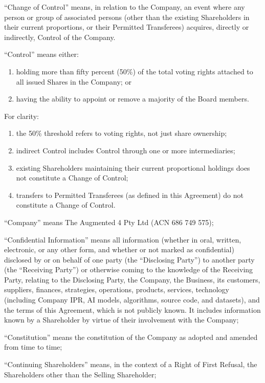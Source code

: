 ``Change of Control'' means, in relation to the Company, an event where any person or group of associated persons (other than the existing Shareholders in their current proportions, or their Permitted Transferees) acquires, directly or indirectly, Control of the Company. 

``Control'' means either:
\begin{enumerate}[label=(\alph*)]
\item holding more than fifty percent (50\%) of the total voting rights attached to all issued Shares in the Company; or
\item having the ability to appoint or remove a majority of the Board members.
\end{enumerate}

For clarity:
\begin{enumerate}[label=(\roman*)]
\item the 50\% threshold refers to voting rights, not just share ownership;
\item indirect Control includes Control through one or more intermediaries;
\item existing Shareholders maintaining their current proportional holdings does not constitute a Change of Control;
\item transfers to Permitted Transferees (as defined in this Agreement) do not constitute a Change of Control.
\end{enumerate}

``Company'' means The Augmented 4 Pty Ltd (ACN 686 749 575);

``Confidential Information'' means all information (whether in oral, written, electronic, or any other form, and whether or not marked as confidential) disclosed by or on behalf of one party (the ``Disclosing Party'') to another party (the ``Receiving Party'') or otherwise coming to the knowledge of the Receiving Party, relating to the Disclosing Party, the Company, the Business, its customers, suppliers, finances, strategies, operations, products, services, technology (including Company IPR, AI models, algorithms, source code, and datasets), and the terms of this Agreement, which is not publicly known. It includes information known by a Shareholder by virtue of their involvement with the Company;

``Constitution'' means the constitution of the Company as adopted and amended from time to time;

``Continuing Shareholders'' means, in the context of a Right of First Refusal, the Shareholders other than the Selling Shareholder;

